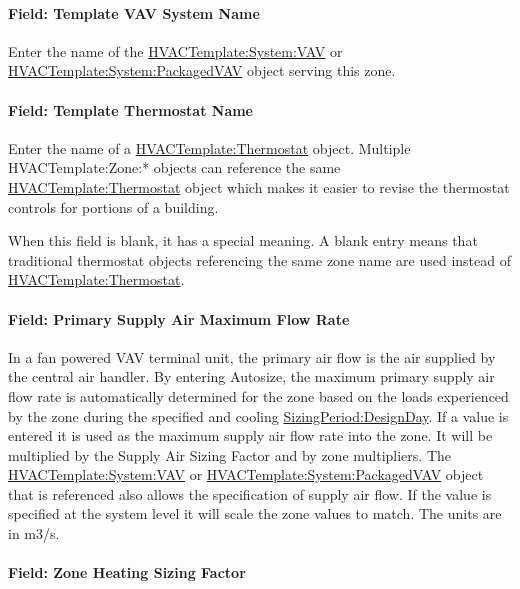 \paragraph{Field: Template VAV System Name}\label{field-template-vav-system-name-1}

Enter the name of the \hyperref[hvactemplatesystemvav]{HVACTemplate:System:VAV} or \hyperref[hvactemplatesystempackagedvav]{HVACTemplate:System:PackagedVAV} object serving this zone.

\paragraph{Field: Template Thermostat Name}\label{field-template-thermostat-name-9}

Enter the name of a \hyperref[hvactemplatethermostat]{HVACTemplate:Thermostat} object. Multiple HVACTemplate:Zone:* objects can reference the same \hyperref[hvactemplatethermostat]{HVACTemplate:Thermostat} object which makes it easier to revise the thermostat controls for portions of a building.

When this field is blank, it has a special meaning. A blank entry means that traditional thermostat objects referencing the same zone name are used instead of \hyperref[hvactemplatethermostat]{HVACTemplate:Thermostat}.

\paragraph{Field: Primary Supply Air Maximum Flow Rate}\label{field-primary-supply-air-maximum-flow-rate}

In a fan powered VAV terminal unit, the primary air flow is the air supplied by the central air handler. By entering Autosize, the maximum primary supply air flow rate is automatically determined for the zone based on the loads experienced by the zone during the specified and cooling \hyperref[sizingperioddesignday]{SizingPeriod:DesignDay}. If a value is entered it is used as the maximum supply air flow rate into the zone. It will be multiplied by the Supply Air Sizing Factor and by zone multipliers. The \hyperref[hvactemplatesystemvav]{HVACTemplate:System:VAV} or \hyperref[hvactemplatesystempackagedvav]{HVACTemplate:System:PackagedVAV} object that is referenced also allows the specification of supply air flow. If the value is specified at the system level it will scale the zone values to match. The units are in m3/s.

\paragraph{Field: Zone Heating Sizing Factor}\label{field-zone-heating-sizing-factor-8}

